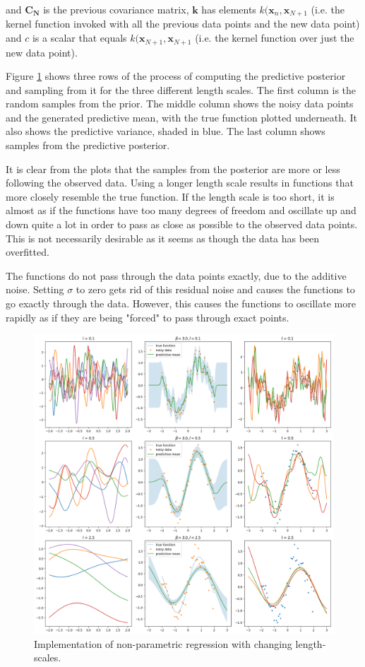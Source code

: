 \documentclass[10pt, a4paper, twocolumn]{article} %
\begin{document}
and $\mathbf{C_N}$ is the previous covariance matrix, $\mathbf{k}$ has elements $k(\mathbf{x}_n, \mathbf{x}_{N+1}$ (i.e. the kernel function invoked with all the previous data points and the new data point) and $c$ is a scalar that equals $k(\mathbf{x}_{N+1}, \mathbf{x}_{N+1}$ (i.e. the kernel function over just the new data point).

Figure \ref{fig:q14} shows three rows of the process of computing the predictive posterior and sampling from it for the three different length scales. The first column is the random samples from the prior. The middle column shows the noisy data points and the generated predictive mean, with the true function plotted underneath. It also shows the predictive variance, shaded in blue. The last column shows samples from the predictive posterior.

It is clear from the plots that the samples from the posterior are more or less following the observed data. Using a longer length scale results in functions that more closely resemble the true function. If the length scale is too short, it is almost as if the functions have too many degrees of freedom and oscillate up and down quite a lot in order to pass as close as possible to the observed data points. This is not necessarily desirable as it seems as though the data has been overfitted.

The functions do not pass through the data points exactly, due to the additive noise. Setting $\sigma$ to zero gets rid of this residual noise and causes the functions to go exactly through the data. However, this causes the functions to oscillate more rapidly as if they are being "forced" to pass through exact points.

\begin{figure}[!htb]
\centerline{\includegraphics[width=\linewidth]{non_parametric_regression.png}}
\caption{Implementation of non-parametric regression with changing length-scales. }
\label{fig:q14}
\end{figure}
\end{document}
